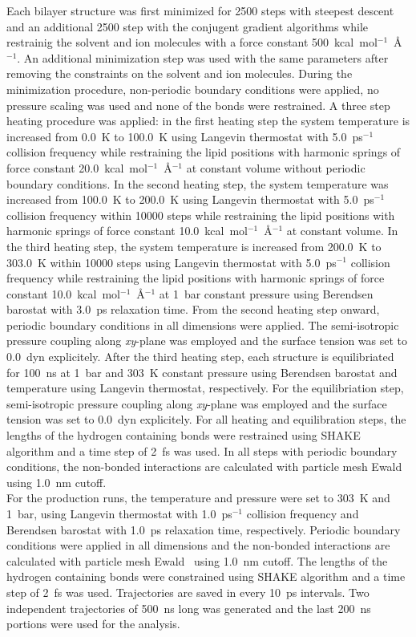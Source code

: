 \documentclass[journal=jpcbfk]{achemso}
\begin{document}
Each bilayer structure was first minimized for 2500 steps with steepest
descent and an additional 2500 step with the conjugent gradient
algorithms while restrainig the solvent and ion molecules with a force
constant 500~kcal~mol$^{-1}$~\AA{}$^{-1}$. An additional minimization
step was used with the same parameters after removing the constraints on
the solvent and ion molecules. During the minimization procedure,
non-periodic boundary conditions were applied, no pressure scaling was
used and none of the bonds were restrained. A three step heating
procedure was applied: in the first heating step the system temperature
is increased from 0.0~K to 100.0~K using Langevin thermostat with
5.0~ps$^{-1}$ collision frequency while restraining the lipid positions
with harmonic springs of force constant
20.0~kcal~mol$^{-1}$~\AA{}$^{-1}$ at constant volume without periodic
boundary conditions. In the second heating step, the system temperature
was increased from 100.0~K to 200.0~K using Langevin thermostat with
5.0~ps$^{-1}$ collision frequency within 10000 steps while restraining
the lipid positions with harmonic springs of force constant
10.0~kcal~mol$^{-1}$~\AA{}$^{-1}$ at constant volume. In the third
heating step, the system temperature is increased from 200.0~K to
303.0~K within 10000 steps using Langevin thermostat with 5.0~ps$^{-1}$
collision frequency while restraining the lipid positions with harmonic
springs of force constant 10.0~kcal~mol$^{-1}$~\AA{}$^{-1}$ at 1~bar
constant pressure using Berendsen barostat with 3.0~ps relaxation time.
From the second heating step onward, periodic boundary conditions in all
dimensions were applied. The semi-isotropic pressure coupling along
\textit{xy}-plane was employed and the surface tension was set to
0.0~dyn explicitely. After the third heating step, each structure is
equilibriated for 100~ns at 1~bar and 303~K constant pressure using
Berendsen barostat and temperature using Langevin thermostat,
respectively. For the equilibriation step, semi-isotropic pressure
coupling along \textit{xy}-plane was employed and the surface tension
was set to 0.0~dyn explicitely. For all heating and equilibration steps,
the lengths of the hydrogen containing bonds were restrained using SHAKE
algorithm and a time step of 2~fs was used. In all steps with periodic
boundary conditions, the non-bonded interactions are calculated with
particle mesh Ewald~\cite{essman95} using 1.0~nm cutoff.\\

For the production runs, the temperature and pressure were set to 303~K
and 1~bar, using Langevin thermostat with 1.0~ps$^{-1}$ collision
frequency and Berendsen barostat with 1.0~ps relaxation time,
respectively. Periodic boundary conditions were applied in all
dimensions and the non-bonded interactions are calculated with particle
mesh Ewald~\cite{essman95} using 1.0~nm cutoff. The lengths of the
hydrogen containing bonds were constrained using SHAKE algorithm and a
time step of 2~fs was used. Trajectories are saved in every 10~ps
intervals. Two independent trajectories of 500~ns long was generated and
the last 200~ns portions were used for the analysis.\\
\end{document}
